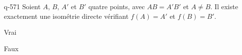 \begin{truefalse}{q-571}
Soient $A$, $B$, $A'$ et $B'$  quatre points, avec $AB=A'B'$ et $A\neq B$. Il existe exactement une isométrie directe vérifiant $f(A)=A'$ et $f(B)=B'$.
\item* Vrai
\item Faux
\end{truefalse}

